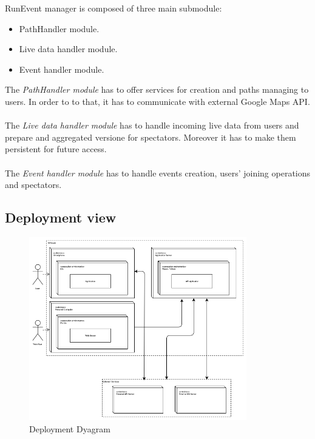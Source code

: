 \documentclass[DD.tex]{subfiles}
\begin{document}
RunEvent manager is composed of three main submodule: \begin{itemize}
	\item PathHandler module.
	\item Live data handler module.
	\item Event handler module.
\end{itemize}

The \textit{PathHandler module} has to offer services for creation and paths managing to users. In order to to that, it has to communicate with external Google Maps API.\\\\
The \textit{Live data handler module} has to handle incoming live data from users and prepare and aggregated versione for spectators. Moreover it has to make them persistent for future access.\\\\
The \textit{Event handler module} has to handle events creation, users' joining operations and spectators.





\newpage
\subsection{Deployment view}

\begin{figure}[h!]
	\centering
	\includegraphics[height=8.00cm,keepaspectratio]{Figures/DeploymentDiagram}
	\caption{Deployment Dyagram}
\end{figure}
\end{document}
